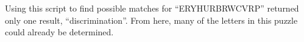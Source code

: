 \documentclass[12pt,a4paper,twoside]{article}
\begin{document}
Using this script to find possible matches for ``ERYHURBRWCVRP'' returned only
one result, ``discrimination''. From here, many of the letters in this puzzle
could already be determined. 




%
%
%



\end{document}
